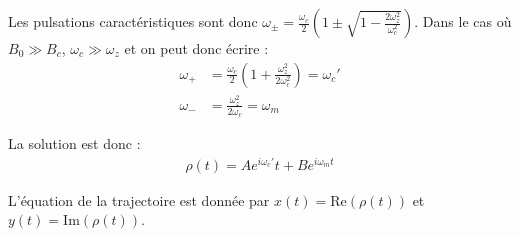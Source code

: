 \documentclass{report}
\begin{document}
\begin{itemize}
		Les pulsations caractéristiques sont donc $\omega_\pm=\frac{\omega_c}{2}\left( 1 \pm\sqrt{1- \frac{2\omega_z^2}{\omega_c^2}}\right)$. Dans le cas où $B_0\gg B_c$, $\omega_c\gg\omega_z$ et on peut donc écrire :
		\begin{align*}
			\omega_+&=\frac{\omega_c}{2}\left( 1 +\frac{\omega_z^2}{2\omega_c^2}\right)= \omega_c'\\
			\omega_-&=\frac{\omega_z^2}{2\omega_c}=\omega_m
		\end{align*}
		
		La solution est donc :
		\begin{align*}
			\rho(t)=Ae^{i\omega_c'}t+Be^{i\omega_mt}
		\end{align*}
		
		L'équation de la trajectoire est donnée par $x(t)=\mathrm{Re}(\rho(t))$ et $y(t)=\mathrm{Im}(\rho(t))$.
		
\end{itemize}
\end{document}
